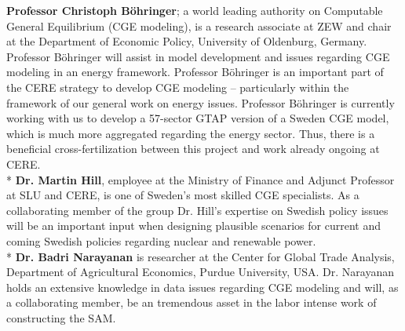 \textbf{Professor Christoph Böhringer}; a world leading authority on Computable General Equilibrium (CGE modeling), is a research associate at ZEW and chair at the Department of Economic Policy, University of Oldenburg, Germany. Professor Böhringer will assist in model development and issues regarding CGE modeling in an energy framework. Professor Böhringer is an important part of the CERE strategy to develop CGE modeling – particularly within the framework of our general work on energy issues. Professor Böhringer is currently working with us to develop a 57-sector GTAP version of a Sweden CGE model, which is much more aggregated regarding the energy sector. Thus, there is a beneficial cross-fertilization between this project and work already ongoing at CERE.\\*
\textbf{Dr. Martin Hill}, employee at the Ministry of Finance and Adjunct Professor at SLU and CERE, is one of Sweden's most skilled CGE specialists. As a collaborating member of the group Dr. Hill’s expertise on Swedish policy issues will be an important input when designing plausible scenarios for current and coming Swedish policies regarding nuclear and renewable power.\\*
\textbf{Dr. Badri Narayanan} is researcher at the Center for Global Trade Analysis, Department of Agricultural Economics, Purdue University, USA. Dr. Narayanan holds an extensive knowledge in data issues regarding CGE modeling and will, as a collaborating member, be an tremendous asset in the labor intense work of constructing the SAM.

